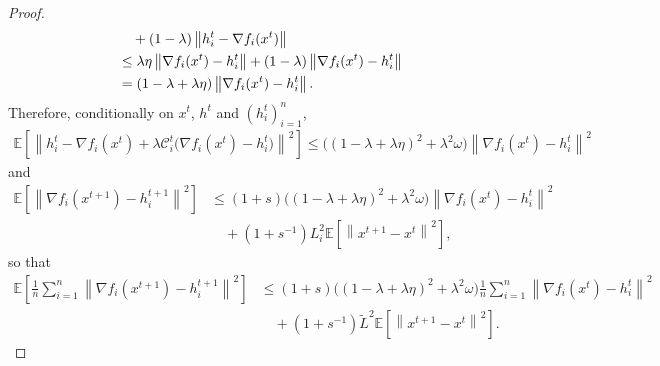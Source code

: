 \documentclass{article} %
\theoremstyle{plain}
\theoremstyle{definition}
\theoremstyle{remark}
\newcommand{\sqnorm}[1]{\left\| #1 \right\|^2}
\newcommand{\Exp}[1]{\mathbb{E}\!\left[ #1 \right]}
\begin{document}
\begin{proof}
\begin{align*}
   &\quad + (1-\lambda)\left\|h_i^{t}-\nabla f_i(x^t)\right\|\\
   &\leq  \lambda\eta\left\|\nabla f_i(x^t)-h_i^{t}\right\|+ (1-\lambda)\left\|\nabla f_i(x^t)-h_i^{t}\right\|\notag\\
   &=(1-\lambda+\lambda\eta)\left\|\nabla f_i(x^t)-h_i^t\right\|.
   \end{align*}
   Therefore, conditionally on $x^t$, $h^t$ and $(h_i^t)_{i=1}^n$, 
   \begin{align*}
   \Exp{\sqnorm{h_i^{t}-\nabla f_i(x^{t}) +\lambda \mathcal{C}_i^t\big(\nabla f_i(x^t)-h_i^t\big)  }}\leq\big((1-\lambda+\lambda\eta)^2+\lambda^2\omega\big) \sqnorm{\nabla f_i(x^t)-h_i^t}
   \end{align*}
   and
   \begin{align*}
   \Exp{\sqnorm{\nabla f_i(x^{t+1})-h_i^{t+1}}}&\leq (1+s)\big((1-\lambda+\lambda\eta)^2+\lambda^2\omega\big) \sqnorm{\nabla f_i(x^{t})-h_i^{t}}\\
   &\quad+(1+s^{-1})L_i^2\Exp
   {\sqnorm{x^{t+1}-x^{t}}},
   \end{align*}
   so that
   \begin{align*}
   \Exp{\frac{1}{n}\sum_{i=1}^n \sqnorm{\nabla f_i(x^{t+1})-h_i^{t+1}}}&
   \leq (1+s)\big((1-\lambda+\lambda\eta)^2+\lambda^2\omega\big) \frac{1}{n}\sum_{i=1}^n \sqnorm{\nabla f_i(x^t)-h_i^{t}}\\
   &\quad+(1+s^{-1})\tilde{L}^2\Exp
   {\sqnorm{x^{t+1}-x^{t}}}.
   \end{align*}


\end{proof}
\end{document}
